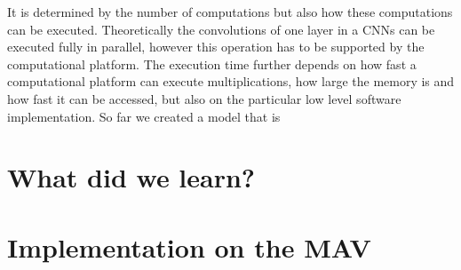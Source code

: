 	 It is determined by the number of computations but also how these computations can be executed. Theoretically the convolutions of one layer in a \acp{CNN} can be executed fully in parallel, however this operation has to be supported by the computational platform. The execution time further depends on how fast a computational platform can execute multiplications, how large the memory is and how fast it can be accessed, but also on the particular low level software implementation. So far we created a model that is 
	 
	 \section{What did we learn?}
	
	\section{Implementation on the \ac{MAV}}